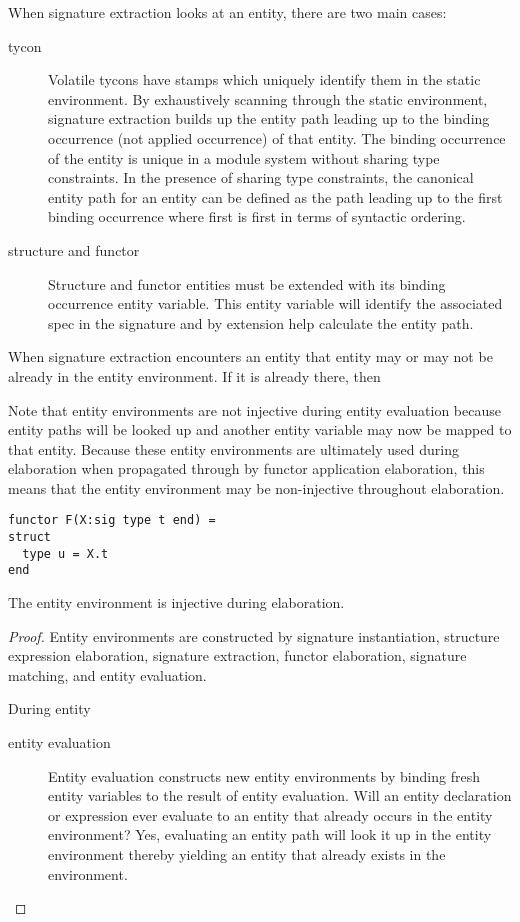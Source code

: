 When signature extraction looks at an entity, there are two main cases:
\begin{description}
\item[tycon] Volatile tycons have stamps which uniquely identify them in the static environment. By exhaustively scanning through the static environment, signature extraction builds up the entity path leading up to the binding occurrence (not applied occurrence) of that entity. The binding occurrence of the entity is unique in a module system without sharing type constraints. In the presence of sharing type constraints, the canonical entity path for an entity can be defined as the path leading up to the first binding occurrence where first is first in terms of syntactic ordering. 
\item[structure and functor] Structure and functor entities must be extended with its binding occurrence entity variable. This entity variable will identify the associated spec in the signature and by extension help calculate the entity path. 
\end{description}

When signature extraction encounters an entity that entity may or may not be already in the entity environment. If it is already there, then 

Note that entity environments are not injective during entity evaluation because entity paths will be looked up and another entity variable may now be mapped to that entity. Because these entity environments are ultimately used during elaboration when propagated through by functor application elaboration, this means that the entity environment may be non-injective throughout elaboration.

\begin{lstlisting}
functor F(X:sig type t end) = 
struct
  type u = X.t
end
\end{lstlisting}

\begin{lemma}\label{lem:entenv-inj}
The entity environment is injective during elaboration. 
\end{lemma}
\begin{proof}
Entity environments are constructed by signature instantiation, structure expression elaboration, signature extraction, functor elaboration, signature matching, and entity evaluation. 

During entity 
\begin{description}
\item[entity evaluation] Entity evaluation constructs new entity environments by binding fresh entity variables to the result of entity evaluation. Will an entity declaration or expression ever evaluate to an entity that already occurs in the entity environment? Yes, evaluating an entity path will look it up in the entity environment thereby yielding an entity that already exists in the environment. 
\end{description}
\end{proof}

